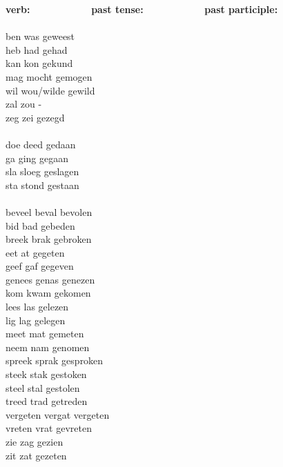 \begin{tabbing}
{\bf verb:}   \ \ \ \ \ \ \ \ \ \ \ \     \=   
{\bf past tense:}  \ \ \ \ \ \ \ \ \ \ \ \    \=    
{\bf past participle:}  \ \ \ \ \ \ \ \ \ \ \ \   \\
          \>              \>            \\
ben       \>   was        \>    geweest \\
heb       \>   had        \>    gehad   \\
kan       \>   kon        \>    gekund  \\
mag       \>   mocht      \>    gemogen \\
wil       \>   wou/wilde  \>    gewild  \\
zal       \>   zou        \>    -       \\
zeg       \>   zei        \>    gezegd  \\
          \>              \>            \\
doe       \>   deed       \>    gedaan  \\
ga        \>   ging       \>    gegaan  \\
sla       \>   sloeg      \>    geslagen \\
sta       \>   stond      \>    gestaan \\
          \>              \>            \\
beveel    \>   beval      \>    bevolen \\
bid       \>   bad        \>    gebeden \\
breek     \>   brak       \>    gebroken \\
eet       \>   at         \>    gegeten \\
geef      \>   gaf        \>    gegeven \\
genees    \>   genas      \>    genezen \\
kom       \>   kwam       \>    gekomen \\
lees      \>   las        \>    gelezen \\
lig       \>   lag        \>    gelegen \\
meet      \>   mat        \>    gemeten \\
neem      \>   nam        \>    genomen \\
spreek    \>   sprak      \>    gesproken \\
steek     \>   stak       \>    gestoken \\
steel     \>   stal       \>    gestolen \\
treed     \>   trad       \>    getreden \\
vergeten  \>   vergat     \>    vergeten \\
vreten    \>   vrat       \>    gevreten \\
zie       \>   zag        \>    gezien   \\
zit       \>   zat        \>    gezeten  \\
\end{tabbing}

